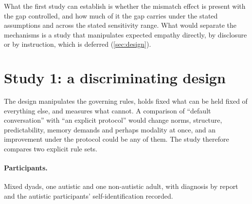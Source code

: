 What the first study can establish is whether the mismatch effect is present with the gap controlled, and how much of it the gap carries under the stated assumptions and across the stated sensitivity range. What would separate the mechanisms is a study that manipulates expected empathy directly, by disclosure or by instruction, which is deferred (\autoref{sec:design}).

\section{Study 1: a discriminating design}
\label{sec:design}

The design manipulates the governing rules, holds fixed what can be held fixed of everything else, and measures what cannot. A comparison of ``default conversation'' with ``an explicit protocol'' would change norms, structure, predictability, memory demands and perhaps modality at once, and an improvement under the protocol could be any of them. The study therefore compares two explicit rule sets.

\paragraph{Participants.} Mixed dyads, one autistic and one non-autistic adult, with diagnosis by report and the autistic participants' self-identification recorded.

